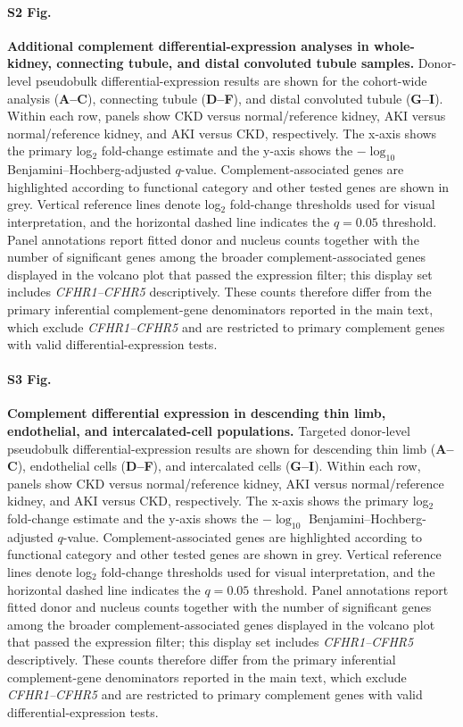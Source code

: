 \documentclass[10pt,letterpaper]{article}
\begin{document}
\paragraph*{S2 Fig.}
\label{S2_Fig}
\textbf{Additional complement differential-expression analyses in whole-kidney, connecting tubule, and distal convoluted tubule samples.}
Donor-level pseudobulk differential-expression results are shown for the cohort-wide analysis (\textbf{A--C}), connecting tubule (\textbf{D--F}), and distal convoluted tubule (\textbf{G--I}). Within each row, panels show CKD versus normal/reference kidney, AKI versus normal/reference kidney, and AKI versus CKD, respectively. The x-axis shows the primary log$_2$ fold-change estimate and the y-axis shows the $-\log_{10}$ Benjamini--Hochberg-adjusted $q$-value. Complement-associated genes are highlighted according to functional category and other tested genes are shown in grey. Vertical reference lines denote log$_2$ fold-change thresholds used for visual interpretation, and the horizontal dashed line indicates the $q=0.05$ threshold. Panel annotations report fitted donor and nucleus counts together with the number of significant genes among the broader complement-associated genes displayed in the volcano plot that passed the expression filter; this display set includes \textit{CFHR1--CFHR5} descriptively. These counts therefore differ from the primary inferential complement-gene denominators reported in the main text, which exclude \textit{CFHR1--CFHR5} and are restricted to primary complement genes with valid differential-expression tests.

\paragraph*{S3 Fig.}
\label{S3_Fig}
\textbf{Complement differential expression in descending thin limb, endothelial, and intercalated-cell populations.}
Targeted donor-level pseudobulk differential-expression results are shown for descending thin limb (\textbf{A--C}), endothelial cells (\textbf{D--F}), and intercalated cells (\textbf{G--I}). Within each row, panels show CKD versus normal/reference kidney, AKI versus normal/reference kidney, and AKI versus CKD, respectively. The x-axis shows the primary log$_2$ fold-change estimate and the y-axis shows the $-\log_{10}$ Benjamini--Hochberg-adjusted $q$-value. Complement-associated genes are highlighted according to functional category and other tested genes are shown in grey. Vertical reference lines denote log$_2$ fold-change thresholds used for visual interpretation, and the horizontal dashed line indicates the $q=0.05$ threshold. Panel annotations report fitted donor and nucleus counts together with the number of significant genes among the broader complement-associated genes displayed in the volcano plot that passed the expression filter; this display set includes \textit{CFHR1--CFHR5} descriptively. These counts therefore differ from the primary inferential complement-gene denominators reported in the main text, which exclude \textit{CFHR1--CFHR5} and are restricted to primary complement genes with valid differential-expression tests.
\end{document}
